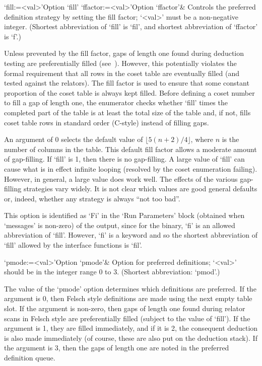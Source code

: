 \beginitems

\>`fill:=<val>'{Option `fill'}
\>`ffactor:=<val>'{Option `ffactor'}&
Controls the preferred definition strategy by setting the fill factor;
`<val>' must be a non-negative integer.
(Shortest abbreviation of `fill' is `fil', and  shortest  abbreviation
of `ffactor' is `f'.)

Unless prevented by the fill factor, gaps of length one  found  during
deduction  testing  are  preferentially   filled   (see~\cite{Hav91}).
However, this potentially violates the  formal  requirement  that  all
rows in the coset table are eventually filled (and tested against  the
relators). The fill factor  is  used  to  ensure  that  some  constant
proportion of the coset table is always kept filled. Before defining a
coset number to fill a  gap  of  length  one,  the  enumerator  checks
whether `fill' times the completed part of the table is at  least  the
total size of the table  and,  if  not,  fills  coset  table  rows  in
standard order (C-style) instead of filling gaps.

An  argument of  0  selects  the default  value  of $\lfloor  5(n+2)/4
\rfloor$,  where $n$  is the  number of  columns in  the  table.  This
default  fill factor  allows  a moderate  amount  of gap-filling.   If
`fill' is  1, then there is  no gap-filling.  A large  value of `fill'
can cause  what is in effect  infinite looping (resolved  by the coset
enumeration failing).   However, in general,  a large value  does work
well.  The  effects of the various gap-filling  strategies vary widely.
It is  not clear  which values are  good general defaults  or, indeed,
whether any strategy is always ``not too bad''.

This option is identified as `Fi' in the  \lq{}Run  Parameters'  block
(obtained when `messages' is non-zero) of the {\ACE} output, since for
the {\ACE} binary, `fi' is an allowed abbreviation of `fill'. However,
`fi' is a {\GAP} keyword and so the shortest  abbreviation  of  `fill'
allowed by the interface functions is `fil'.

\>`pmode:=<val>'{Option `pmode'}&
Option for preferred definitions; `<val>' should  be  in  the  integer
range 0 to 3. (Shortest abbreviation: `pmod'.)

The  value of  the  `pmode' option  determines  which definitions  are
preferred.  If  the argument is  0, then Felsch style  definitions are
made using  the next empty table  slot.  If the  argument is non-zero,
then gaps of length one found during relator scans in Felsch style are
preferentially  filled  (subject to  the  value  of  `fill').  If  the
argument  is 1,  they are  filled  immediately, and  if it  is 2,  the
consequent deduction  is also made  immediately (of course,  these are
also put on the deduction stack).  If the argument is 3, then the gaps
of length one are noted in the preferred definition queue.

